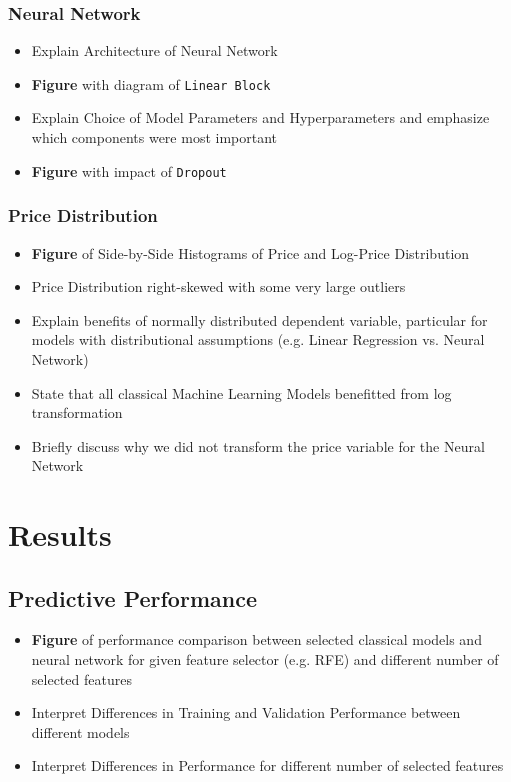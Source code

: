 \documentclass[12pt, letterpaper]{article}
\begin{document}
\subsubsection{Neural Network}
\begin{itemize}
    \item Explain Architecture of Neural Network
    \item \textbf{Figure} with diagram of \texttt{Linear Block}
    \item Explain Choice of Model Parameters and Hyperparameters and emphasize which components were most important
    \item \textbf{Figure} with impact of \texttt{Dropout}
\end{itemize}


\subsubsection{Price Distribution}
\begin{itemize}
    \item \textbf{Figure} of Side-by-Side Histograms of Price and Log-Price Distribution
    \item Price Distribution right-skewed with some very large outliers
    \item Explain benefits of normally distributed dependent variable, particular for models with distributional assumptions (e.g. Linear Regression vs. Neural Network)
    \item State that all classical Machine Learning Models benefitted from log transformation
    \item Briefly discuss why we did not transform the price variable for the Neural Network
\end{itemize}


\section{Results}

\subsection{Predictive Performance}
\begin{itemize}
    \item \textbf{Figure} of performance comparison between selected classical models and neural network for given feature selector (e.g. RFE) and different number of selected features
    \item Interpret Differences in Training and Validation Performance between different models
    \item Interpret Differences in Performance for different number of selected features
\end{itemize}
\end{document}
